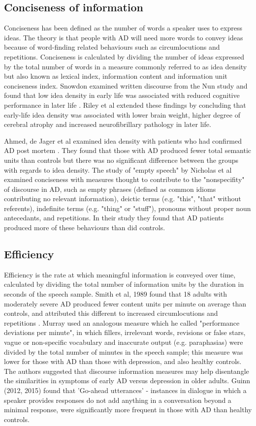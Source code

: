 \documentclass[10pt, letterpaper, twoside, openany]{book}
\begin{document}
\subsection{Conciseness of information}
Conciseness has been defined as the number of words a speaker uses to express ideas. The theory is that people with AD will need more words to convey ideas because of word-finding related behaviours such as circumlocutions and repetitions. Conciseness is calculated by dividing the number of ideas expressed by the total number of words in a measure commonly referred to as idea density but also known as lexical index, information content and information unit conciseness index. Snowdon examined written discourse from the Nun study and found that low idea density in early life was associated with reduced cognitive performance in later life \cite{Snowdon1996}. Riley et al extended these findings by concluding that early-life idea density was associated with lower brain weight, higher degree of cerebral atrophy and increased neurofibrillary pathology in later life.
\par
Ahmed, de Jager et al examined idea density with patients who had confirmed AD post mortem \cite{Ahmed2013}. They found that those with AD produced fewer total semantic units than controls but there was no significant difference between the groups with regards to idea density. The study of "empty speech" by Nicholas et al examined conciseness with measures thought to contribute to the "nonspecifity" of discourse in AD, such as empty phrases (defined as common idioms contributing no relevant information), deictic terms (e.g. "this", "that" without referents), indefinite terms (e.g. "thing" or "stuff"), pronouns without proper noun antecedants, and repetitions. In their study they found that AD patients produced more of these behaviours than did controls.
\par
\subsection{Efficiency}
Efficiency is the rate at which meaningful information is conveyed over time, calculated by dividing the total number of information units by the duration in seconds of the speech sample. Smith et al, 1989 found that 18 adults with moderately severe AD produced fewer content units per minute on average than controls, and attributed this different to increased circumlocutions and repetitions \cite{Smith1989}. Murray used an analogous measure which he called "performance deviations per minute", in which fillers, irrelevant words, revisions or false stars, vague or non-specific vocabulary and inaccurate output (e.g. paraphasias) were divided by the total number of minutes in the speech sample; this measure was lower for those with AD than those with depression, and also healthy controls. The authors suggested that discourse information measures may help disentangle the similarities in symptoms of early AD versus depression in older adults. Guinn (2012, 2015) \cite{Guinn2012, Guinn2015} found that 'Go-ahead utterances' - instances in dialogue in which a speaker provides responses do not add anything in a conversation beyond a minimal response, were significantly more frequent in those with AD than healthy controls.
\end{document}
